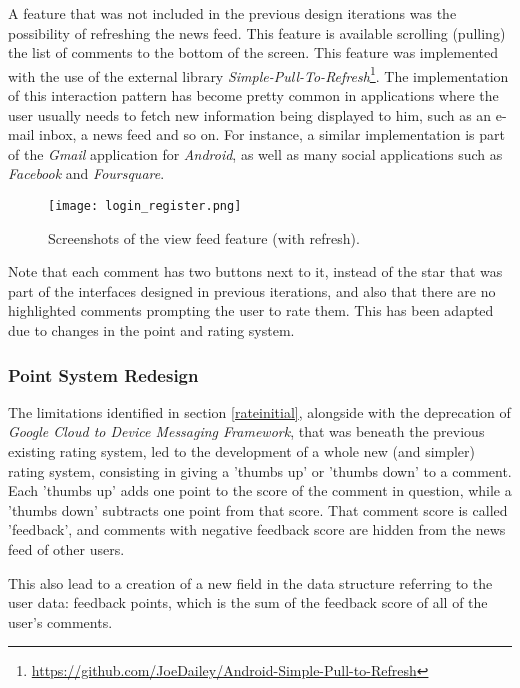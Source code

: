 A feature that was not included in the previous design iterations was the possibility of refreshing the news feed. This feature is available scrolling (pulling) the list of comments to the bottom of the screen. This feature was implemented with the use of the external library \emph{Simple-Pull-To-Refresh}\footnote{\url{https://github.com/JoeDailey/Android-Simple-Pull-to-Refresh}}. The implementation of this interaction pattern has become pretty common in applications where the user usually needs to fetch new information being displayed to him, such as an e-mail inbox, a news feed and so on. For instance, a similar implementation is part of the \emph{Gmail} application for \emph{Android}, as well as many social applications such as \emph{Facebook} and \emph{Foursquare}. 

\begin{figure}[!h]
  \begin{center}
    \leavevmode
    \texttt{[image: login\_register.png]}
    \caption{Screenshots of the view feed feature (with refresh).}
    \label{fig:feed2}
  \end{center}
\end{figure}


Note that each comment has two buttons next to it, instead of the star that was part of the interfaces designed in previous iterations, and also that there are no highlighted comments prompting the user to rate them. This has been adapted due to changes in the point and rating system.

\subsubsection{Point System Redesign}

The limitations identified in section \ref{rateinitial}, alongside with the deprecation of \emph{Google Cloud to Device Messaging Framework}, that was beneath the previous existing rating system, led to the development of a whole new (and simpler) rating system, consisting in giving a 'thumbs up' or 'thumbs down' to a comment. Each 'thumbs up' adds one point to the score of the comment in question, while a 'thumbs down' subtracts one point from that score. That comment score is called 'feedback', and comments with negative feedback score are hidden from the news feed of other users. 

This also lead to a creation of a new field in the data structure referring to the user data: feedback points, which is the sum of the feedback score of all of the user's comments.


